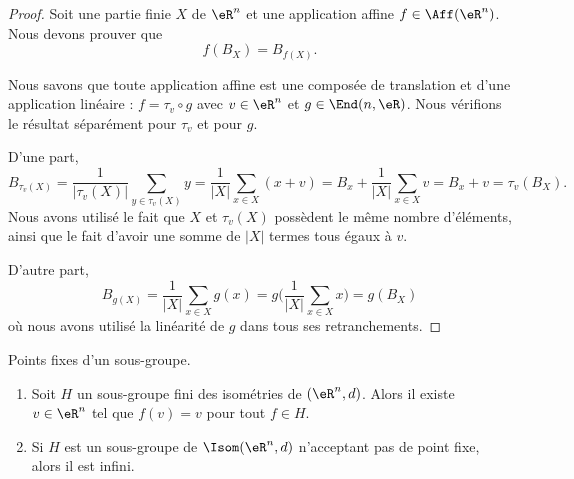 \begin{proof}
	Soit une partie finie \( X\) de \( \eR^n\) et une application affine \( f\in\Aff(\eR^n)\). Nous devons prouver que
	\begin{equation}
		f(B_X)=B_{f(X)}.
	\end{equation}

	Nous savons que toute application affine est une composée de translation et d'une application linéaire : \( f=\tau_v\circ g\) avec \( v\in \eR^n\) et \( g\in \End(n,\eR)\). Nous vérifions le résultat séparément pour \( \tau_v\) et pour \( g\).

	D'une part,
	\begin{equation}
		B_{\tau_v(X)}=\frac{1}{ | \tau_v(X) | }\sum_{y\in \tau_v(X)}y=\frac{1}{ | X | }\sum_{x\in X}(x+v)=B_x+\frac{1}{ | X | }\sum_{x\in X}v=B_x+v=\tau_v(B_X).
	\end{equation}
	Nous avons utilisé le fait que \( X\) et \( \tau_v(X)\) possèdent le même nombre d'éléments, ainsi que le fait d'avoir une somme de \( | X |\) termes tous égaux à \( v\).

	D'autre part,
	\begin{equation}
		B_{g(X)}=\frac{1}{ | X | }\sum_{x\in X}g(x)=g\big( \frac{1}{ |X | }\sum_{x\in X}x \big)=g(B_X)
	\end{equation}
	où nous avons utilisé la linéarité de \( g\) dans tous ses retranchements.
\end{proof}

\begin{proposition}     \label{PROPooLAEBooWdcBoe}
	Points fixes d'un sous-groupe.
	\begin{enumerate}
		\item
		      Soit \( H\) un sous-groupe fini des isométries de \( (\eR^n,d)\). Alors il existe \( v\in \eR^n\) tel que \( f(v)=v\) pour tout \( f\in H\).
		\item
		      Si \( H\) est un sous-groupe de \( \Isom(\eR^n,d)\) n'acceptant pas de point fixe, alors il est infini.
	\end{enumerate}
\end{proposition}


